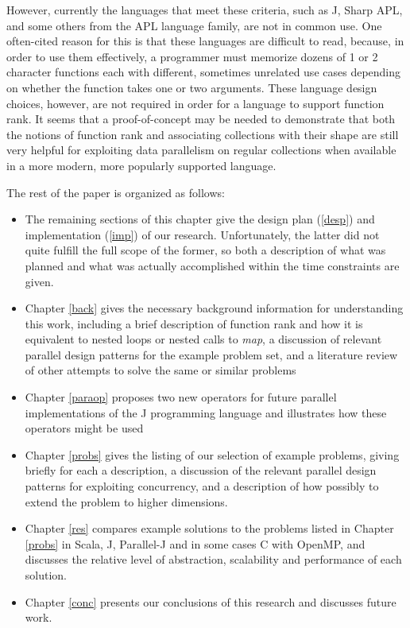 However, currently the languages that meet these criteria, 
such as J, Sharp APL, and some others from the APL language family, 
are not in common use. %
One often-cited reason for this is that these languages are difficult to read, %
because, in order to use them effectively, a programmer must memorize 
dozens of 1 or 2 character functions each with different, sometimes unrelated use cases 
depending on whether the function takes one or two arguments.\cite{jvocab} %
These language design choices, however, 
are not required in order for a language to support function rank.
It seems that a proof-of-concept may be needed 
to demonstrate that both the notions of function rank
and associating collections with their shape
are still very helpful for exploiting data parallelism on regular collections 
when available in a more modern, more popularly supported language.

The rest of the paper is organized as follows:
\begin{itemize} 
	\item The remaining sections of this chapter give the design plan (\ref{desp}) and implementation (\ref{imp}) of our research. 
	Unfortunately, the latter did not quite fulfill the full scope of the former, 
	so both a description of what was planned and what was actually accomplished within the time constraints are given.
	\item Chapter \ref{back} gives the necessary background information for understanding this work, 
	including a brief description of function rank and how it is equivalent to nested loops or nested calls to \textit{map},
	a discussion of relevant parallel design patterns for the example problem set, 
	and a literature review of other attempts to solve the same or similar problems
	\item Chapter \ref{paraop} proposes two new operators for future parallel implementations of the J programming language 
		and illustrates how these operators might be used
    \item Chapter \ref{probs} gives the listing of our selection of example problems, giving briefly for each a description, a discussion of the relevant parallel design patterns for exploiting concurrency, and a description of how possibly to extend the problem to higher dimensions.
    \item Chapter \ref{res} compares example solutions to the problems listed in Chapter \ref{probs} in Scala, J, Parallel-J and in some cases C with OpenMP, and discusses the relative level of abstraction, scalability and performance of each solution. %
    \item Chapter \ref{conc} presents our conclusions of this research and discusses future work. 
\end{itemize}

